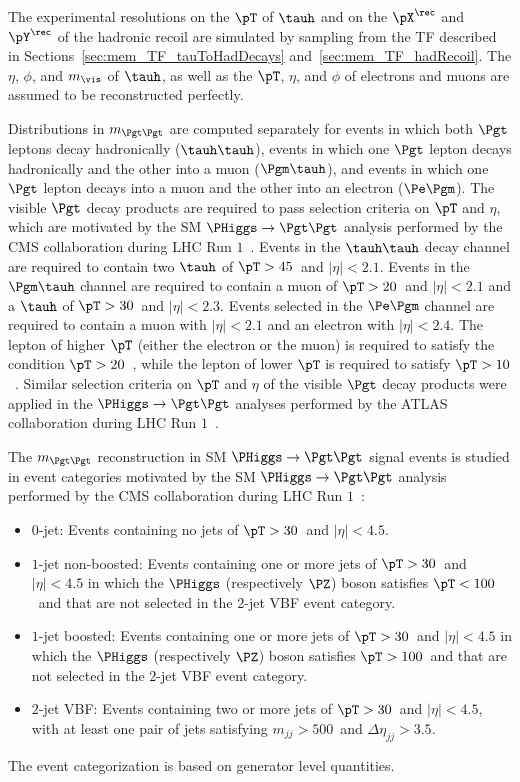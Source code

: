 The experimental resolutions on the $\pT$ of $\tauh$ and on the $\pX^{\rec}$ and $\pY^{\rec}$ of the hadronic recoil 
are simulated by sampling from the TF described in
Sections~\ref{sec:mem_TF_tauToHadDecays}
and~\ref{sec:mem_TF_hadRecoil}.
The $\eta$, $\phi$, and $m_{\vis}$ of $\tauh$,
as well as the $\pT$, $\eta$, and $\phi$ of electrons and muons are assumed to be reconstructed perfectly.

Distributions in $m_{\Pgt\Pgt}$ are computed separately for events in which 
both $\Pgt$ leptons decay hadronically ($\tauh\tauh$), 
events in which one $\Pgt$ lepton decays hadronically and the other into a muon ($\Pgm\tauh$),
and events in which one $\Pgt$ lepton decays into a muon and the other into an electron ($\Pe\Pgm$).
The visible $\Pgt$ decay products are required to pass selection criteria on $\pT$ and $\eta$,
which are motivated by the SM $\PHiggs \to \Pgt\Pgt$ analysis performed by the CMS collaboration during LHC Run $1$~\cite{HIG-13-004}.
Events in the $\tauh\tauh$ decay channel are required to contain
two $\tauh$ of $\pT > 45$~\GeV and $\vert\eta\vert < 2.1$.
Events in the $\Pgm\tauh$ channel
are required to contain a muon of $\pT > 20$~\GeV and $\vert\eta\vert < 2.1$ and a $\tauh$ of $\pT > 30$~\GeV and $\vert\eta\vert < 2.3$.
Events selected in the $\Pe\Pgm$ channel are required to contain a muon with $\vert\eta\vert < 2.1$ and an electron with $\vert\eta\vert < 2.4$.
The lepton of higher $\pT$ (either the electron or the muon) is required to satisfy the condition $\pT > 20$~\GeV,
while the lepton of lower $\pT$ is required to satisfy $\pT > 10$~\GeV.
Similar selection criteria on $\pT$ and $\eta$ of the visible $\Pgt$ decay products were applied in the $\PHiggs \to \Pgt\Pgt$
analyses performed by the ATLAS
collaboration during LHC Run $1$~\cite{ATLAS_HiggsTauTau_SM,ATLAS_HiggsTauTau_MSSM}.

The $m_{\Pgt\Pgt}$ reconstruction in SM $\PHiggs \to \Pgt\Pgt$ signal events is studied in event categories motivated by the
SM $\PHiggs \to \Pgt\Pgt$ analysis performed by the CMS collaboration during LHC Run $1$~\cite{HIG-13-004}:
\begin{itemize}
\item $0$-jet: 
  Events containing no jets of $\pT > 30$~\GeV and $\lvert \eta \rvert < 4.5$.
\item $1$-jet non-boosted:
  Events containing one or more jets of $\pT > 30$~\GeV and $\lvert \eta \rvert < 4.5$
  in which the $\PHiggs$ (respectively $\PZ$) boson satisfies $\pT < 100$~\GeV and that are not selected in the $2$-jet VBF event category.
\item $1$-jet boosted:
  Events containing one or more jets of $\pT > 30$~\GeV and $\lvert \eta \rvert < 4.5$
  in which the $\PHiggs$ (respectively $\PZ$) boson satisfies $\pT > 100$~\GeV and that are not selected in the $2$-jet VBF event category.
\item $2$-jet VBF:
  Events containing two or more jets of $\pT > 30$~\GeV and $\lvert \eta \rvert < 4.5$,
  with at least one pair of jets satisfying $m_{jj} > 500$~\GeV and $\Delta\eta_{jj} > 3.5$.
\end{itemize}
The event categorization is based on generator level quantities.

